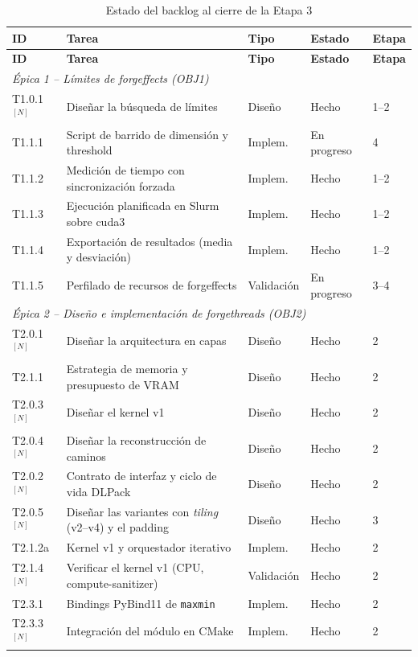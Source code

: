 \documentclass[11pt,a4paper]{article}
\newcommand{\Hecho}{\textcolor{hecho}{Hecho}}
\newcommand{\EnProg}{\textcolor{prog}{En progreso}}
\newcommand{\N}{$^{[N]}$}
\begin{document}
{\small
\begin{longtable}{p{1.45cm}p{7.3cm}p{1.6cm}p{1.75cm}p{0.9cm}}
\caption{Estado del backlog al cierre de la Etapa 3}\label{tab:backlog}\\
\toprule
\textbf{ID} & \textbf{Tarea} & \textbf{Tipo} & \textbf{Estado} & \textbf{Etapa}\\
\midrule\endfirsthead
\toprule
\textbf{ID} & \textbf{Tarea} & \textbf{Tipo} & \textbf{Estado} & \textbf{Etapa}\\
\midrule\endhead
\multicolumn{5}{l}{\emph{Épica 1 -- Límites de forgeffects (OBJ1)}}\\
T1.0.1\N & Diseñar la búsqueda de límites & Diseño & \Hecho & 1--2\\
T1.1.1 & Script de barrido de dimensión y threshold & Implem. & \EnProg & 4\\
T1.1.2 & Medición de tiempo con sincronización forzada & Implem. & \Hecho & 1--2\\
T1.1.3 & Ejecución planificada en Slurm sobre cuda3 & Implem. & \Hecho & 1--2\\
T1.1.4 & Exportación de resultados (media y desviación) & Implem. & \Hecho & 1--2\\
T1.1.5 & Perfilado de recursos de forgeffects & Validación & \EnProg & 3--4\\
\midrule
\multicolumn{5}{l}{\emph{Épica 2 -- Diseño e implementación de forgethreads (OBJ2)}}\\
T2.0.1\N & Diseñar la arquitectura en capas & Diseño & \Hecho & 2\\
T2.1.1 & Estrategia de memoria y presupuesto de VRAM & Diseño & \Hecho & 2\\
T2.0.3\N & Diseñar el kernel v1 & Diseño & \Hecho & 2\\
T2.0.4\N & Diseñar la reconstrucción de caminos & Diseño & \Hecho & 2\\
T2.0.2\N & Contrato de interfaz y ciclo de vida DLPack & Diseño & \Hecho & 2\\
T2.0.5\N & Diseñar las variantes con \emph{tiling} (v2--v4) y el padding & Diseño & \Hecho & 3\\
T2.1.2a & Kernel v1 y orquestador iterativo & Implem. & \Hecho & 2\\
T2.1.4\N & Verificar el kernel v1 (CPU, compute-sanitizer) & Validación & \Hecho & 2\\
T2.3.1 & Bindings PyBind11 de \texttt{maxmin} & Implem. & \Hecho & 2\\
T2.3.3\N & Integración del módulo en CMake & Implem. & \Hecho & 2\\

\end{longtable}}
\end{document}

